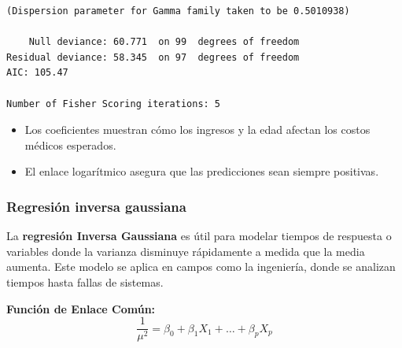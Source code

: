 \documentclass[
  letterpaper,
  DIV=11,
  numbers=noendperiod]{scrreprt}
\providecommand{\tightlist}{%
  \setlength{\itemsep}{0pt}\setlength{\parskip}{0pt}}
\begin{document}
\begin{tcolorbox}
\begin{verbatim}
(Dispersion parameter for Gamma family taken to be 0.5010938)

    Null deviance: 60.771  on 99  degrees of freedom
Residual deviance: 58.345  on 97  degrees of freedom
AIC: 105.47

Number of Fisher Scoring iterations: 5
\end{verbatim}

\begin{itemize}
\tightlist
\item
  Los coeficientes muestran cómo los ingresos y la edad afectan los
  costos médicos esperados.
\item
  El enlace logarítmico asegura que las predicciones sean siempre
  positivas.
\end{itemize}

\end{tcolorbox}

\subsubsection{Regresión inversa
gaussiana}\label{regresiuxf3n-inversa-gaussiana}

La \textbf{regresión Inversa Gaussiana} es útil para modelar tiempos de
respuesta o variables donde la varianza disminuye rápidamente a medida
que la media aumenta. Este modelo se aplica en campos como la
ingeniería, donde se analizan tiempos hasta fallas de sistemas.

\textbf{Función de Enlace Común:}
\[\frac{1}{\mu^2} = \beta_0 + \beta_1 X_1 + \dots + \beta_p X_p\]
\end{document}
